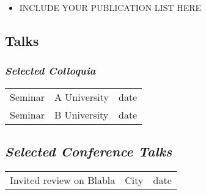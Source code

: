\documentclass[COG,11pt]{ercgrant}
\begin{document}
\color{red}
\begin{itemize}[topsep=0pt,itemsep=0.62ex,partopsep=0ex,parsep=0.5ex]
	\item INCLUDE YOUR PUBLICATION LIST HERE
\end{itemize}
\color{black}

\subsection{Talks}
\subsubsection{\textit{Selected Colloquia}}

\color{red}
\begin{longtable}{p{7.5cm}p{6cm}l}
	Seminar & A University & date \\
	Seminar & B University & date \\
\end{longtable}
\color{black}

\subsection{\textit{Selected Conference Talks}}

\color{red}
\begin{longtable}{p{7.5cm}p{6cm}l}
	Invited review on Blabla & City & date \\
\end{longtable}
\color{black}
\end{document}

